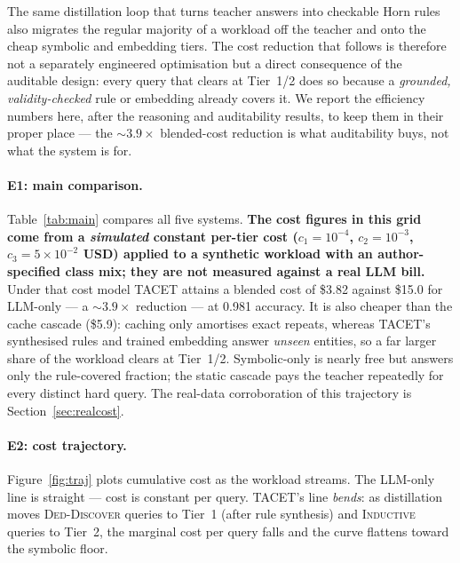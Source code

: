 \documentclass[11pt]{article}
\theoremstyle{plain}
\newcommand{\akCost}{3.82}
\newcommand{\akAcc}{0.981}
\newcommand{\llmCost}{15.0}
\newcommand{\costFactor}{3.9}
\newcommand{\cacheCost}{5.9}
\newcommand{\seeds}{8}
\begin{document}
The same distillation loop that turns teacher answers into checkable Horn
rules also migrates the regular majority of a workload off the teacher and
onto the cheap symbolic and embedding tiers. The cost reduction that follows
is therefore not a separately engineered optimisation but a direct
consequence of the auditable design: every query that clears at Tier~1/2
does so because a \emph{grounded, validity-checked} rule or embedding already
covers it. We report the efficiency numbers here, after the reasoning and
auditability results, to keep them in their proper place --- the
${\sim}\costFactor\times$ blended-cost reduction is what auditability buys,
not what the system is for.

\paragraph{E1: main comparison.} Table~\ref{tab:main} compares all five
systems. \textbf{The cost figures in this grid come from a \emph{simulated}
constant per-tier cost ($c_1{=}10^{-4}$, $c_2{=}10^{-3}$,
$c_3{=}5{\times}10^{-2}$ USD) applied to a synthetic workload with an
author-specified class mix; they are not measured against a real LLM bill.}
Under that cost model TACET attains a blended cost of \$\akCost{} against
\$\llmCost{} for LLM-only --- a ${\sim}\costFactor\times$ reduction --- at
\akAcc{} accuracy. It is also cheaper than the cache cascade (\$\cacheCost{}):
caching only amortises exact repeats, whereas TACET's synthesised rules
and trained embedding answer \emph{unseen} entities, so a far larger share
of the workload clears at Tier~1/2. Symbolic-only is nearly free but
answers only the rule-covered fraction; the static cascade pays the teacher
repeatedly for every distinct hard query. The real-data corroboration of this
trajectory is Section~\ref{sec:realcost}.

\begin{table}[t]
\centering
\caption{Main cost--accuracy comparison across systems (\seeds{} seeds).}
\label{tab:main}

\end{table}

\paragraph{E2: cost trajectory.} Figure~\ref{fig:traj} plots cumulative
cost as the workload streams. The LLM-only line is straight --- cost is
constant per query. TACET's line \emph{bends}: as distillation moves
\textsc{Ded-Discover} queries to Tier~1 (after rule synthesis) and
\textsc{Inductive} queries to Tier~2, the marginal cost per query falls and
the curve flattens toward the symbolic floor.
\end{document}
